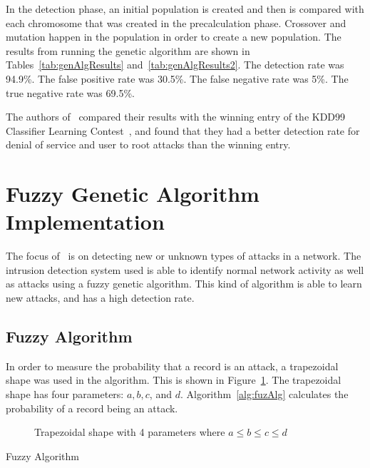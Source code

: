 \documentclass{sig-alternate}
\begin{document}
In the detection phase, an initial population is created and then is compared with each chromosome that was created in the precalculation phase. Crossover and mutation happen in the population in order to create a new population. The results from running the genetic algorithm are shown in Tables~\ref{tab:genAlgResults} and~\ref{tab:genAlgResults2}. The detection rate was 94.9\%. The false positive rate was 30.5\%. The false negative rate was 5\%. The true negative rate was 69.5\%.

The authors of~\cite{DBLP:journals/corr/abs-1204-1336} compared their results with the winning entry of the KDD99 Classifier Learning Contest~\cite{KDD99Contest}, and found that they had a better detection rate for denial of service and user to root attacks than the winning entry.




\section{Fuzzy Genetic Algorithm Implementation}
\label{sec:fuzGenAlgImp}
The focus of~\cite{6496342, 6559603} is on detecting new or unknown types of attacks in a network. The intrusion detection system used is able to identify normal network activity as well as attacks using a fuzzy genetic algorithm. This kind of algorithm is able to learn new attacks, and has a high detection rate. 




\subsection{Fuzzy Algorithm}
In order to measure the probability that a record is an attack, a trapezoidal shape was used in the algorithm. This is shown in Figure~\ref{fig:trapFigure}. The trapezoidal shape has four parameters: $a, b, c$, and $d$. Algorithm~\ref{alg:fuzAlg} calculates the probability of a record being an attack.

\begin{figure}
\centering
{}
\caption{Trapezoidal shape with 4 parameters where $a\leq b\leq c\leq d$}
\label{fig:trapFigure}
\end{figure}

\begin{algorithm}
\caption{Fuzzy Algorithm}
\label{alg:fuzAlg}
\begin{algorithmic}
\ELSE {}
\ENDIF
\end{algorithmic}
\end{algorithm}
\end{document}
